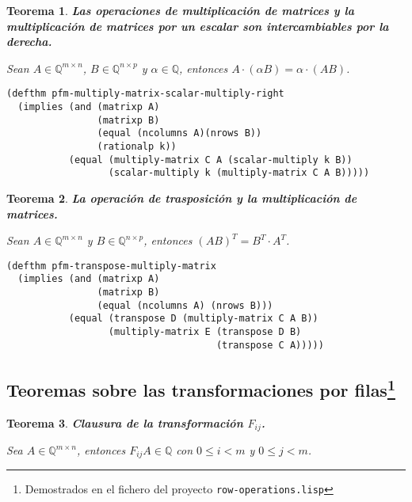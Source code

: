 \documentclass[a4paper,10pt]{article}
\newcommand{\Q}[1]{#1 \in \mathbb{Q}}
\newcommand{\M}[3]{#1 \in \mathbb{Q}^{#2 \times #3}}
\newtheorem{teor}{{Teorema}}
\begin{document}
\par \vspace{16pt}

\begin{teor} \textbf{Las operaciones de multiplicación de matrices y la multiplicación de matrices por un escalar son intercambiables por la derecha.}\vspace{8pt}\par
Sean $\M{A}{m}{n}$, $\M{B}{n}{p}$ y $\Q{\alpha}$, entonces $A\cdot (\alpha B) = \alpha\cdot(AB)$.
\end{teor}

\begin{lstlisting}[language=clips]
(defthm pfm-multiply-matrix-scalar-multiply-right
  (implies (and (matrixp A)
                (matrixp B)
                (equal (ncolumns A)(nrows B))
                (rationalp k))
           (equal (multiply-matrix C A (scalar-multiply k B))
                  (scalar-multiply k (multiply-matrix C A B)))))
\end{lstlisting}

\par \vspace{16pt}

\begin{teor} \textbf{La operación de trasposición y la multiplicación de matrices.}\vspace{8pt}\par
Sean $\M{A}{m}{n}$ y $\M{B}{n}{p}$, entonces $(AB)^T = B^T\cdot A^T$.
\end{teor}

\begin{lstlisting}[language=clips]
(defthm pfm-transpose-multiply-matrix
  (implies (and (matrixp A)
                (matrixp B)
                (equal (ncolumns A) (nrows B)))
           (equal (transpose D (multiply-matrix C A B))
                  (multiply-matrix E (transpose D B) 
                                     (transpose C A)))))
\end{lstlisting}

\vspace{12pt}
\subsection[Teoremas sobre las transformaciones por filas]{Teoremas sobre las transformaciones por filas\footnote{Demostrados en el fichero del proyecto \texttt{row-operations.lisp}}}
\vspace{10pt}

\begin{teor} \textbf{Clausura de la transformación $F_{ij}$.}\vspace{8pt}\par
Sea $\M{A}{m}{n}$, entonces $\Q{F_{ij}A}$ con $0 \leq i < m$ y $0 \leq j < m$.
\end{teor}
\end{document}
